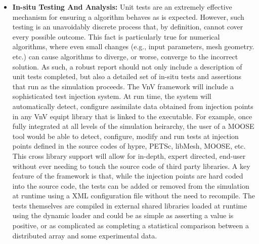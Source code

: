 \begin{itemize}
 
 \item{ \bf In-situ Testing And Analysis:} Unit tests are an extremely effective mechanism for ensuring a algorithm behaves as is expected. However, such testing is an unavoidably discrete process that, by definition, cannot cover every possible outcome. This fact is particularly true for numerical algorithms, where even small changes (e.g., input parameters, mesh geometry. etc.) can cause algorithms to diverge, or worse, converge to the incorrect solution. As such, a robust \VV report should not only include a description of unit tests completed, but also a detailed set of in-situ tests and assertions that run as the simulation proceeds. The VnV framework will include a sophisticated test injection system. At run time, the system will automatically detect, configure assimilate data obtained from injection points in any VnV equipt library that is linked to the executable. For example, once fully integrated at all levels of the simulation heirarchy, the user of a MOOSE tool would be able to detect, configure, modify and run tests at injection points defined in the source codes of hypre, PETSc, libMesh, MOOSE, etc. This cross library support will allow for in-depth, expert directed, end-user \VV without ever needing to touch the source code of third party libraries. A key feature of the framework is that, while the injection points are hard coded into the source code, the tests can be added or removed from the simulation at runtime using a XML configuration file without the need to recompile. The tests themselves are compiled in external shared libraries loaded at runtime using the dynamic loader and could be as simple as asserting a value is positive, or as complicated as completing a statistical comparison between a distributed array and some experimental data. 
  

\end{itemize}
